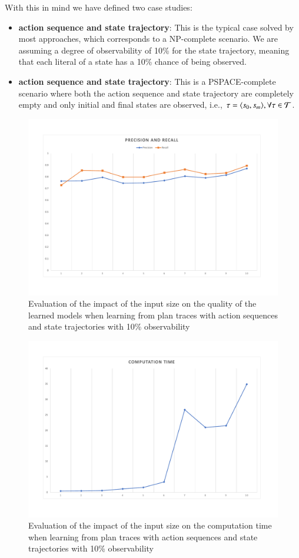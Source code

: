With this in mind we have defined two case studies:
\begin{itemize}
	\item \textbf{\FO action sequence and \PO state trajectory}: This is the typical case solved by most approaches, which corresponds to a NP-complete scenario. We are assuming a degree of observability of 10\% for the state trajectory, meaning that each literal of a state has a 10\% chance of being observed.
	\item  \textbf{\NO action sequence and \NO state trajectory}: This is a PSPACE-complete scenario where both the action sequence and state trajectory are completely empty and only initial and final states are observed, i.e., $\tau = {\langle s_0, s_m \rangle}, \forall \tau \in \mathcal{T}$.
\end{itemize}

\begin{figure}[hbt!]
	\centering
	\includegraphics[width=0.8\linewidth]{figures/input_size_100_10_precision.pdf}
	\caption{Evaluation of the impact of the input size on the quality of the learned models when learning from plan traces with \FO action sequences and \PO state trajectories with 10\% observability}
\end{figure}

\begin{figure}[hbt!]
	\centering
	\includegraphics[width=0.8\linewidth]{figures/input_size_100_10_time.pdf}
	\caption{Evaluation of the impact of the input size on the computation time when learning from plan traces with \FO action sequences and \PO state trajectories with 10\% observability}
\end{figure}

